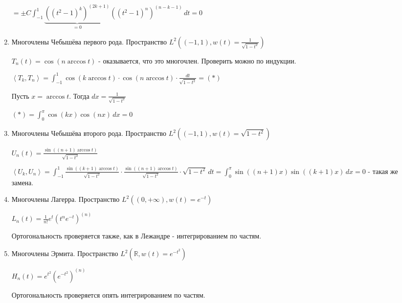 \begin{remark}
\begin{remark}
\begin{example}
\begin{enumerate}
{                    $= \pm C \int_{-1}^1 \underbrace{((t^2 - 1)^k)^{(2k + 1)}}_{=0} ((t^2 - 1)^n)^{(n - k - 1)} \, dt = 0$
                }
                \item {
                    Многочлены Чебышёва первого рода. Пространство $L^2 ((-1, 1), w(t) = \frac{1}{\sqrt{1 - t^2}})$

                    $T_n (t) = \cos (n \arccos t)$ - оказывается, что это многочлен. Проверить можно по индукции.

                    $\left < T_k, T_n \right > = \int_{-1}^1 \cos (k \arccos t) \cdot \cos (n \arccos t) \cdot \frac{dt}{\sqrt{1 - t^2}} = (*)$

                    Пусть $x = \arccos t$. Тогда $dx = \frac{1}{\sqrt{1 - t^2}}$

                    $(*) = \int_0^\pi \cos (kx) \cos (nx) \, dx = 0$
                }
                \item {
                    Многочлены Чебышёва второго рода. Пространство $L^2 ((-1, 1), w(t) = \sqrt{1 - t^2})$

                    $U_n (t) = \frac{\sin ((n + 1) \arccos t)}{\sqrt{1 - t^2}}$

                    $\left < U_k, U_n \right > = \int_{-1}^1 \frac{\sin ((k + 1) \arccos t)}{\sqrt{1 - t^2}} \cdot \frac{\sin ((n + 1) \arccos t)}{\sqrt{1 - t^2}} \cdot \sqrt{1 - t^2} \, dt = \int_0^\pi \sin ((n + 1)x) \sin ((k + 1)x) \, dx = 0$ - такая же замена.
                }
                \item {
                    Многочлены Лагерра. Пространство $L^2 ((0, +\infty), w(t) = e^{-t})$

                    $L_n (t) = \frac{1}{n!} e^t (t^n e^{-t})^{(n)}$

                    Ортогональность проверяется также, как в Лежандре - интегрированием по частям.
                }
                \item {
                    Многочлены Эрмита. Пространство $L^2 (\mathbb{R}, w(t) = e^{-t^2})$

                    $H_n (t) = e^{t^2} (e^{-t^2})^{(n)}$

                    Ортогональность проверяется опять интегрированием по частям.
                }
            \end{enumerate}
        \end{example}
    \end{remark}
\end{remark}


